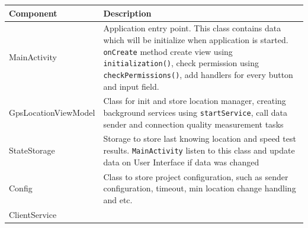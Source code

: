 \begin{longtable}[]{@{}ll@{}}
\toprule
\begin{minipage}[b]{0.47\columnwidth}\raggedright
Component\strut
\end{minipage} & \begin{minipage}[b]{0.47\columnwidth}\raggedright
Description\strut
\end{minipage}\tabularnewline
\midrule
\endhead
\begin{minipage}[t]{0.47\columnwidth}\raggedright
MainActivity\strut
\end{minipage} & \begin{minipage}[t]{0.47\columnwidth}\raggedright
Application entry point. This class contains data which will be
initialize when application is started. \texttt{onCreate} method create
view using \texttt{initialization()}, check permission using
\texttt{checkPermissions()}, add handlers for every button and input
field.\strut
\end{minipage}\tabularnewline
\begin{minipage}[t]{0.47\columnwidth}\raggedright
GpsLocationViewModel\strut
\end{minipage} & \begin{minipage}[t]{0.47\columnwidth}\raggedright
Class for init and store location manager, creating background services
using \texttt{startService}, call data sender and connection quality
measurement tasks\strut
\end{minipage}\tabularnewline
\begin{minipage}[t]{0.47\columnwidth}\raggedright
StateStorage\strut
\end{minipage} & \begin{minipage}[t]{0.47\columnwidth}\raggedright
Storage to store last knowing location and speed test results.
\texttt{MainActivity} listen to this class and update data on User
Interface if data was changed\strut
\end{minipage}\tabularnewline
\begin{minipage}[t]{0.47\columnwidth}\raggedright
Config\strut
\end{minipage} & \begin{minipage}[t]{0.47\columnwidth}\raggedright
Class to store project configuration, such as sender configuration,
timeout, min location change handling and etc.\strut
\end{minipage}\tabularnewline
\begin{minipage}[t]{0.47\columnwidth}\raggedright
ClientService\strut
\end{minipage} & \begin{minipage}[t]{0.47\columnwidth}\raggedright

\end{minipage}
\end{longtable}
